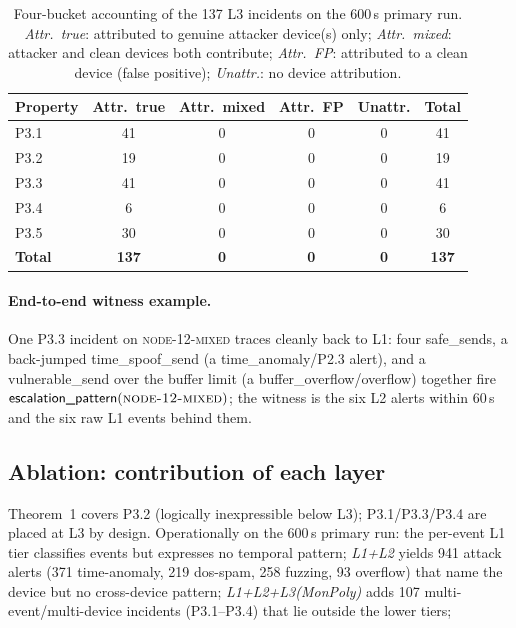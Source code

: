 \documentclass[runningheads]{llncs}
\begin{document}
\begin{table}[t]
\centering
\caption{Four-bucket accounting of the 137 L3 incidents on the
600\,s primary run. \emph{Attr.\ true}: attributed to genuine
attacker device(s) only; \emph{Attr.\ mixed}: attacker and clean
devices both contribute; \emph{Attr.\ FP}: attributed to a clean
device (false positive); \emph{Unattr.}: no device attribution.}
\label{tab:incident-classification}
\renewcommand{\arraystretch}{1.1}
\setlength{\tabcolsep}{4pt}
\footnotesize
\begin{tabular}{@{}l c c c c c@{}}
\toprule
\textbf{Property} & \textbf{Attr.\ true} & \textbf{Attr.\ mixed} & \textbf{Attr.\ FP} & \textbf{Unattr.} & \textbf{Total} \\
\midrule
P3.1     & 41  & 0 & 0 & 0 & 41 \\
P3.2     & 19   & 0 & 0 & 0 & 19 \\
P3.3     & 41   & 0 & 0  & 0 & 41  \\
P3.4     &  6  & 0 & 0  & 0 &  6  \\
P3.5     &  30   & 0 & 0  & 0 &  30  \\
\midrule
\textbf{Total} & \textbf{137} & \textbf{0} & \textbf{0} & \textbf{0} & \textbf{137} \\
\bottomrule
\end{tabular}
\end{table}

\paragraph{End-to-end witness example.}
One P3.3 incident on \textsc{node-12-mixed} traces cleanly back to
L1: four \textsf{safe\_send}s, a back-jumped \textsf{time\_spoof\_send}
(a \textsf{time\_anomaly}/P2.3 alert), and a
\textsf{vulnerable\_send} over the buffer limit (a
\textsf{buffer\_overflow}/\textsf{overflow}) together fire
$\textsf{escalation\_pattern}(\textsc{node-12-mixed})$; the witness
is the six L2 alerts within 60\,s and the six raw L1 events behind them.

\subsection{Ablation: contribution of each layer}
\label{sec:eval:ablation}

Theorem~1 covers P3.2 (logically inexpressible below L3); P3.1/P3.3/P3.4
are placed at L3 by design.  Operationally on the 600\,s
primary run: the per-event L1 tier classifies
events but expresses no temporal pattern; \emph{L1+L2} yields 941 attack
alerts (371 time-anomaly, 219 dos-spam, 258 fuzzing, 93 overflow) that name
the device but no cross-device pattern; \emph{L1+L2+L3(MonPoly)}
adds 107 multi-event/multi-device incidents (P3.1--P3.4) that lie outside the lower tiers;
\end{document}
